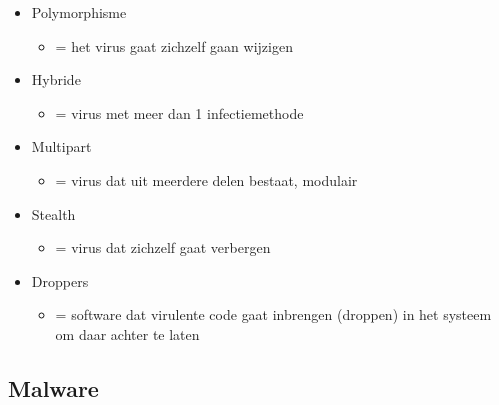 \documentclass{article}
\begin{document}
\begin{itemize}
    \item Polymorphisme
    \begin{itemize}
        \item = het virus gaat zichzelf gaan wijzigen
    \end{itemize}
    \item Hybride
    \begin{itemize}
        \item = virus met meer dan 1 infectiemethode
    \end{itemize}
    \item Multipart
    \begin{itemize}
        \item = virus dat uit meerdere delen bestaat, modulair
    \end{itemize}
    \item Stealth
    \begin{itemize}
        \item = virus dat zichzelf gaat verbergen
    \end{itemize}
    \item Droppers
    \begin{itemize}
        \item = software dat virulente code gaat inbrengen (droppen) in het systeem om daar achter te laten
    \end{itemize}
\end{itemize}

\subsection{Malware}
\end{document}
